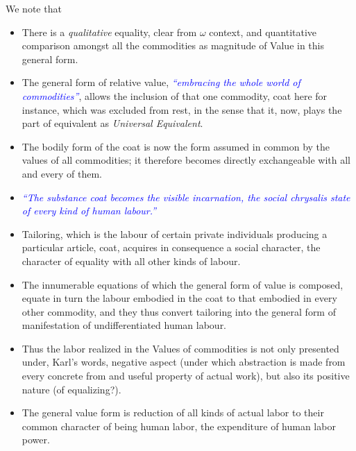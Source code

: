 \documentclass[12pt]{extarticle}
\theoremstyle{definition}
\newenvironment{remark}[1][Remark]{\begin{trivlist}
\item[\hskip \labelsep {\bfseries #1}]}{\end{trivlist}}
\begin{document}
  \begin{remark}
    We note that
    \begin{itemize}
    \item There is a \emph{qualitative} equality, clear from $\omega$ context, and quantitative comparison amongst all the commodities as magnitude of Value in this general form.
    \item The general form of relative value, \emph{\textcolor{blue}{``embracing the whole world of commodities''}}, allows the inclusion of that one commodity, coat here for instance, which was excluded from rest, in the sense that it, now, plays the part of equivalent as \emph{Universal Equivalent}.
    \item The bodily form of the coat is now the form assumed in common by the values of all commodities; it therefore becomes directly exchangeable with all and every of them.
      \item \emph{\textcolor{blue}{``The substance coat becomes the visible incarnation, the social chrysalis state
            of every kind of human labour.''}}
        \item Tailoring, which is the labour of certain private individuals
producing a particular article, coat, acquires in consequence a social character, the character of
equality with all other kinds of labour.
\item The innumerable equations of which the general form of
value is composed, equate in turn the labour embodied in the coat to that embodied in every
other commodity, and they thus convert tailoring into the general form of manifestation of
undifferentiated human labour.
\item Thus the labor realized in the Values of commodities is not only presented under, Karl's words, negative aspect (under which abstraction is made from every concrete from and useful property of actual work), but also its positive nature (of equalizing?).
  \item The general value form is reduction of all kinds of actual labor to their common character of being human labor, the expenditure of human labor power.
    \end{itemize}
  \end{remark}
  
\end{document}

